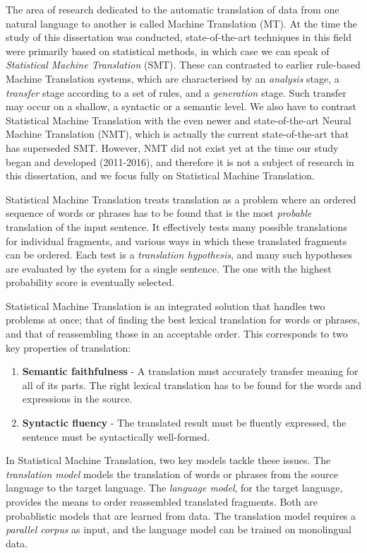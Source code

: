 The area of research dedicated to the automatic translation of data from one natural language to another is called
Machine Translation (MT).  At the time the study of this dissertation was conducted, state-of-the-art techniques in this
field were primarily based on statistical methods, in which case we can speak of \emph{Statistical Machine Translation}
(SMT). These can contrasted to earlier rule-based Machine Translation systems, which are characterised by an
\emph{analysis} stage, a \emph{transfer} stage according to a set of rules, and a \emph{generation} stage. Such transfer
may occur on a shallow, a syntactic or a semantic level. We also have to contrast Statistical Machine Translation with
the even newer and state-of-the-art Neural Machine Translation (NMT), which is actually the current state-of-the-art
that has superseded SMT. However, NMT did not exist yet at the time our study began and developed (2011-2016), and therefore it is not a subject of research in this dissertation, and we focus fully on Statistical Machine Translation.

Statistical Machine Translation treats translation as a problem where an
ordered sequence of words or phrases has to be found that is the most
\emph{probable} translation of the input sentence. It effectively tests many possible
translations for individual fragments, and various ways in which these
translated fragments can be ordered. Each test is a \emph{translation
hypothesis}, and many such hypotheses are evaluated by the system
for a single sentence. The one with the highest probability score is eventually
selected.

Statistical Machine Translation is an integrated solution that handles two
problems at once; that of finding the best lexical translation for words or
phrases, and that of reassembling those in an acceptable order. This corresponds to
two key properties of translation:

\begin{enumerate}
	\item \textbf{Semantic faithfulness} - A translation must accurately transfer meaning for all of its parts. The right lexical translation has to be found for the words and expressions in the source.
	\item \textbf{Syntactic fluency} - The translated result must be fluently
        expressed, the sentence must be syntactically well-formed.
\end{enumerate}

In Statistical Machine Translation, two key models tackle these issues. The
\emph{translation model} models the translation of words or phrases from the
source language to the target language. The \emph{language model}, for the
target language, provides the means to order reassembled translated fragments. Both
are probablistic models that are learned from data. The translation model
requires a \emph{parallel corpus} as input, and the language model can be
trained on monolingual data.

